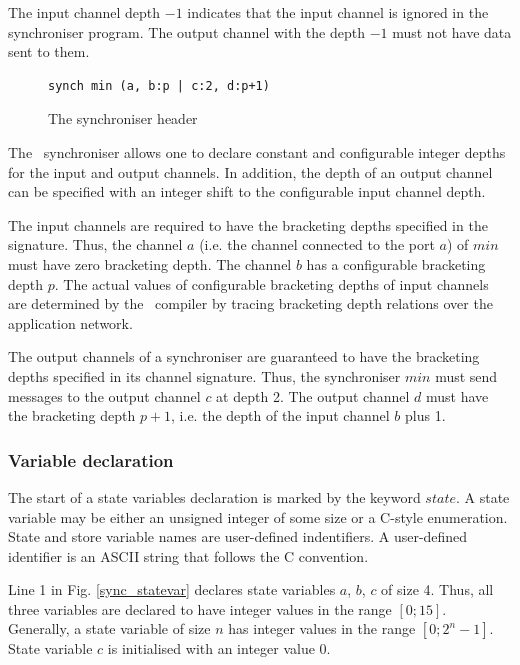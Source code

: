 The input channel depth $-1$ indicates that the input channel is ignored in the synchroniser program. The output channel with the depth $-1$ must not have data sent to them.

\begin{figure}[h!]
\begin{lstlisting}[frame=single]
synch min (a, b:p | c:2, d:p+1)
\end{lstlisting}
\caption{The synchroniser header}
\label{min_sync_head}
\end{figure}


The \ak\ synchroniser allows one to declare constant and configurable integer depths for the input and output channels. In addition, the depth of an output channel can be specified with an integer shift to the configurable input channel depth.

The input channels are required to have the bracketing depths specified in the signature. Thus, the channel $a$ (i.e. the channel connected to the port $a$) of $min$ must have zero bracketing depth. The channel $b$ has a configurable bracketing depth $p$. The actual values of configurable bracketing depths of input channels are determined by the \ak\ compiler by tracing bracketing depth relations over the application network.

The output channels of a synchroniser are guaranteed to have the bracketing depths specified in its channel signature. Thus, the synchroniser $min$ must send messages to the output channel $c$ at depth 2. The output channel $d$ must have the bracketing depth $p+1$, i.e. the depth of the input channel $b$ plus 1.


  \subsubsection{Variable declaration}
The start of a state variables declaration is marked by the keyword $state$. A state variable may be either an unsigned integer of some size or a C-style enumeration. State and store variable names are user-defined indentifiers. A user-defined identifier is an ASCII string that follows the C convention.

Line 1 in Fig. \ref{sync_statevar} declares state variables $a$, $b$, $c$ of size 4. Thus, all three variables are declared to have integer values in the range $[0; 15]$. Generally, a state variable of size $n$ has integer values in the range $[0; 2^{n}-1]$. State variable $c$ is initialised with an integer value 0.

